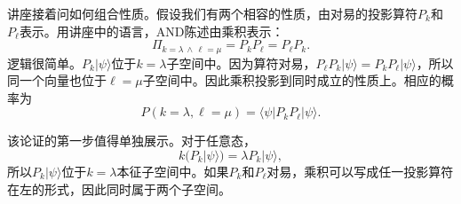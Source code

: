 \begin{classroomqa}
\end{classroomqa}

\begin{classroomqa}
\end{classroomqa}

\begin{classroomqa}
\end{classroomqa}

\begin{classroomqa}
\end{classroomqa}

讲座接着问如何组合性质。假设我们有两个相容的性质，由对易的投影算符\(P_k\)和\(P_\ell\)表示。用讲座中的语言，AND陈述由乘积表示：
\begin{equation}
\Pi_{k=\lambda\,\wedge\,\ell=\mu}=P_kP_\ell=P_\ell P_k.
\end{equation}
逻辑很简单。\(P_k|\psi\rangle\)位于\(k=\lambda\)子空间中。因为算符对易，\(P_\ell P_k|\psi\rangle=P_kP_\ell|\psi\rangle\)，所以同一个向量也位于\(\ell=\mu\)子空间中。因此乘积投影到同时成立的性质上。相应的概率为
\begin{equation}
P(k=\lambda,\ell=\mu)=\langle\psi|P_kP_\ell|\psi\rangle.
\end{equation}

该论证的第一步值得单独展示。对于任意态，
\begin{equation}
k\bigl(P_k|\psi\rangle\bigr)=\lambda P_k|\psi\rangle,
\end{equation}
所以\(P_k|\psi\rangle\)位于\(k=\lambda\)本征子空间中。如果\(P_k\)和\(P_\ell\)对易，乘积可以写成任一投影算符在左的形式，因此同时属于两个子空间。

